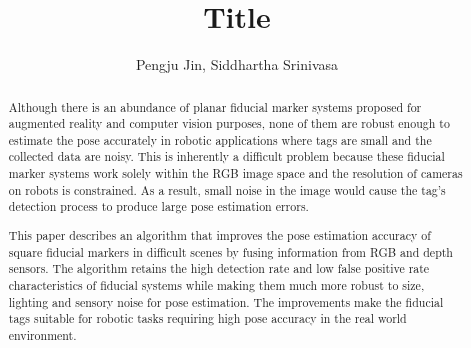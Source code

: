 \documentclass[letterpaper,conference,10pt]{ieeetran}
\begin{document}
\title{\vspace{0.20in}\LARGE Title}

\author{Pengju Jin, Siddhartha Srinivasa}
\maketitle 	

\begin{abstract}
Although there is an abundance of planar fiducial marker systems proposed for augmented reality and computer vision purposes, none of them are robust enough to estimate the pose accurately in robotic applications where tags are small and the collected data are noisy. This is inherently a difficult problem because these fiducial marker systems work solely within the RGB image space and the resolution of cameras on robots is constrained. As a result, small noise in the image would cause the tag's detection process to produce large pose estimation errors. 

This paper describes an algorithm that improves the pose estimation accuracy of square fiducial markers in difficult scenes by fusing information from RGB and depth sensors. The algorithm retains the high detection rate and low false  positive rate characteristics of fiducial systems while making them much more robust to size, lighting and sensory noise for pose estimation. The improvements make the fiducial tags suitable for robotic tasks requiring high pose accuracy in the real world environment.
\end{abstract}

\IEEEpeerreviewmaketitle













{\footnotesize

}
\end{document}
